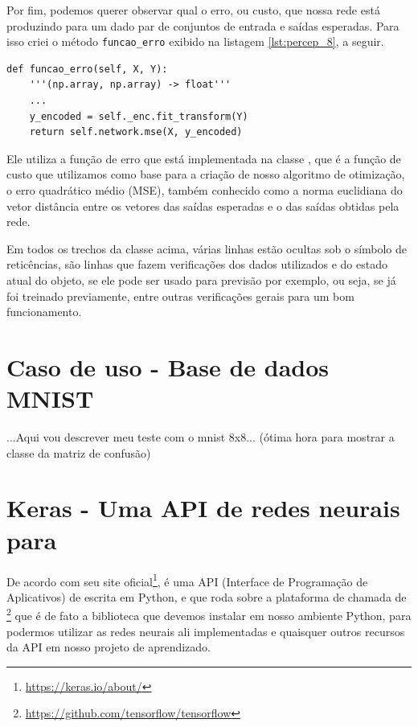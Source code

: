 Por fim, podemos querer observar qual o erro, ou custo, que nossa rede está produzindo para um dado par de conjuntos de entrada e saídas esperadas. Para isso criei o método \texttt{funcao\_erro} exibido na listagem \ref{lst:percep_8}, a seguir. 

\begin{scriptsize}
\estiloR
\begin{lstlisting}[caption={Trecho da classe \eng{Perceptron}}, label={lst:percep_8}, escapeinside={\%}]
def funcao_erro(self, X, Y):
    '''(np.array, np.array) -> float'''
    ...
    y_encoded = self._enc.fit_transform(Y)
    return self.network.mse(X, y_encoded)
\end{lstlisting}
\end{scriptsize}

Ele utiliza a função de erro que está implementada na classe , que é a função de custo que utilizamos como base para a criação de nosso algoritmo de otimização, o erro quadrático médio (MSE), também conhecido como a norma euclidiana do vetor distância entre os vetores das saídas esperadas e o das saídas obtidas pela rede.

Em todos os trechos da classe  acima, várias linhas estão ocultas sob o símbolo de reticências, são linhas que fazem verificações dos dados utilizados e do estado atual do objeto, se ele pode ser usado para previsão por exemplo, ou seja, se já foi treinado previamente, entre outras verificações gerais para um bom funcionamento.

\section{Caso de uso - Base de dados MNIST}

...Aqui vou descrever meu teste com o mnist 8x8... (ótima hora para mostrar a classe da matriz de confusão)

\section{Keras - Uma API de redes neurais para }

De acordo com seu site oficial\footnote{\url{https://keras.io/about/}},  é uma API (Interface de Programação de Aplicativos) de  escrita em Python, e que roda sobre a plataforma de  chamada de \footnote{\url{https://github.com/tensorflow/tensorflow}} que é de fato a biblioteca que devemos instalar em nosso ambiente Python, para podermos utilizar as redes neurais ali implementadas e quaisquer outros recursos da API  em nosso projeto de aprendizado.

